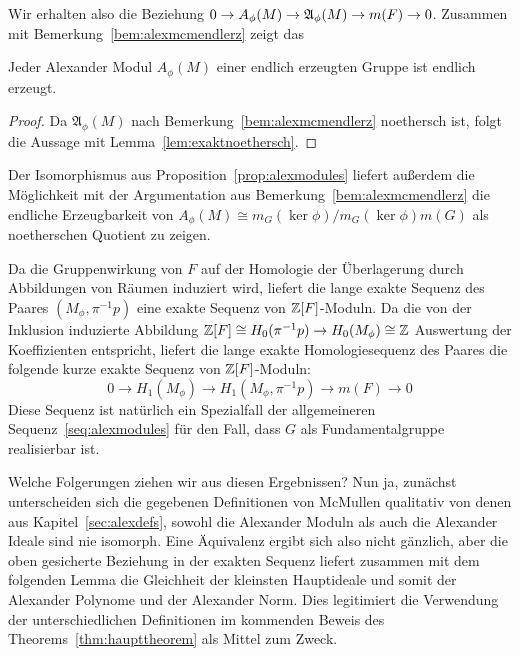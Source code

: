 Wir erhalten also die Beziehung $0\to A_\phi(M)\to\mathfrak A_\phi(M)\to m(F)\to0$. Zusammen mit Bemerkung~\ref{bem:alexmcmendlerz} zeigt das
	
\begin{cor}
\label{cor:alexendlerz}
		Jeder Alexander Modul $A_\phi(M)$ einer endlich erzeugten Gruppe ist endlich erzeugt. 
\end{cor}
\begin{proof}
	Da $\mathfrak A_\phi(M)$ nach Bemerkung~\ref{bem:alexmcmendlerz} noethersch ist, folgt die Aussage mit Lemma~\ref{lem:exaktnoethersch}.
\end{proof}
\begin{bem}
	Der Isomorphismus aus Proposition~\ref{prop:alexmodules} liefert außerdem die Möglichkeit mit der Argumentation aus Bemerkung~\ref{bem:alexmcmendlerz} die endliche Erzeugbarkeit von $A_\phi(M)\cong m_G(\ker\phi)/m_G(\ker\phi)m(G)$ als noetherschen Quotient zu zeigen.
\end{bem}

Da die Gruppenwirkung von $F$ auf der Homologie der Überlagerung durch Abbildungen von Räumen induziert wird, liefert die lange exakte Sequenz des Paares $(M_\phi,\pi^{-1} p)$ eine exakte Sequenz von $\mathbb{Z}[F]$-Moduln. Da die von der Inklusion induzierte Abbildung $\mathbb{Z}[F]\cong H_0(\pi^{-1} p) \to H_0 (M_\phi) \cong \mathbb{Z}$ Auswertung der Koeffizienten entspricht, liefert die lange exakte Homologiesequenz des Paares die folgende kurze exakte Sequenz von $\mathbb{Z}[F]$-Moduln:
	\begin{equation}
	0 \to H_1(M_\phi) \to H_1(M_\phi,\pi^{-1} p ) \to m(F) \to 0 \label{seq:leshomology}
	\end{equation}
Diese Sequenz ist natürlich ein Spezialfall der allgemeineren Sequenz~\eqref{seq:alexmodules} für den Fall, dass $G$ als Fundamentalgruppe realisierbar ist.

Welche Folgerungen ziehen wir aus diesen Ergebnissen? Nun ja, zunächst unterscheiden sich die gegebenen Definitionen von McMullen qualitativ von denen aus Kapitel~\ref{sec:alexdefs}, sowohl die Alexander Moduln als auch die Alexander Ideale sind nie isomorph. Eine Äquivalenz ergibt sich also nicht gänzlich, aber die oben gesicherte Beziehung in der exakten Sequenz liefert zusammen mit dem folgenden Lemma die Gleichheit der kleinsten Hauptideale und somit der Alexander Polynome und der Alexander Norm. Dies legitimiert die Verwendung der unterschiedlichen Definitionen im kommenden Beweis des Theorems~\ref{thm:haupttheorem} als Mittel zum Zweck.

